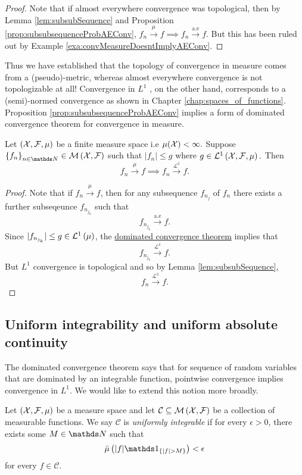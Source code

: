 \begin{proof}
Note that if almost everywhere convergence was topological, then by
Lemma \ref{lem:subsubSequence} and Proposition \ref{prop:subsubsequenceProbAEConv},
$f_{n}\stackrel{\mu}{\longrightarrow}f\implies f_{n}\stackrel{\text{a.e}}{\longrightarrow}f$.
But this has been ruled out by Example \ref{exa:convMeasureDoesntImplyAEConv}.
\end{proof}
Thus we have established that the topology of convergence in measure
comes from a (pseudo)-metric, whereas almost everywhere convergence
is not topologizable at all! Convergence in $L^{1}$ , on the other
hand, corresponds to a (semi)-normed convergence as shown in Chapter
\ref{chap:spaces_of_functions}. Proposition \ref{prop:subsubsequenceProbAEConv}
implies a form of dominated convergence theorem for convergence in
measure.
\begin{prop}
\label{prop:convMeasureDomConv}Let $\left(\mathcal{X},\mathcal{F},\mu\right)$ be a
finite measure space i.e $\mu(\mathcal{X})<\infty.$ Suppose $\left\{ f_{n}\right\} _{n\in\N}\in\measurableFunctions$
such that $\lvert f_{n}\rvert\leq g$ where $g\in\mathcal{L}^{1}\left(\mathcal{X},\mathcal{F},\mu\right).$
Then
\[
f_{n}\stackrel{\mu}{\longrightarrow}f\implies f_{n}\stackrel{\mathcal{L}^{1}}{\longrightarrow}f.
\]
\end{prop}

\begin{proof}
Note that if $f_{n}\stackrel{\mu}{\longrightarrow}f$, then for any
subsequence $f_{n_{j}}$ of $f_{n}$ there exists a further subseqeunce
$f_{n_{j_{k}}}$ such that 
\[
f_{n_{j_{k}}}\stackrel{\text{a.e}}{\longrightarrow}f.
\]
Since $\lvert f_{n_{j_{k}}}\rvert\leq g\in\mathcal{L}^{1}\left(\mu\right)$, the \hyperref[thm:generalizedDominatedConvergence]{dominated convergence theorem}
implies that 
\[
f_{n_{j_{k}}}\stackrel{\mathcal{L}^{1}}{\longrightarrow}f.
\]
But $L^{1}$ convergence is topological and so by Lemma \ref{lem:subsubSequence},
\[
f_{n}\stackrel{\mathcal{L}^{1}}{\longrightarrow}f.
\]
\end{proof}

\subsection{Uniform integrability and uniform absolute continuity}

The dominated convergence theorem says that for sequence of random
variables that are dominated by an integrable function, pointwise
convergence implies convergence in $L^{1}$. We would like to extend
this notion more broadly.
\begin{defn}
\label{def:uniformIntegrability}Let $\left(\mathcal{X},\mathcal{F},\mu\right)$ be
a measure space and let $\mathcal{C}\subseteq\mathcal{M}\left(\mathcal{X},\mathcal{F}\right)$
be a collection of measurable functions. We say $\mathcal{C}$ is
\emph{uniformly integrable }if for every $\epsilon>0$, there exists
some $M\in\N$ such that 
\[
\lebInt{\mu}{\lvert f\rvert\indicate_{\{\lvert f\rvert>M\}}}<\epsilon
\]
for every $f\in\mathcal{C}$.
\end{defn}

